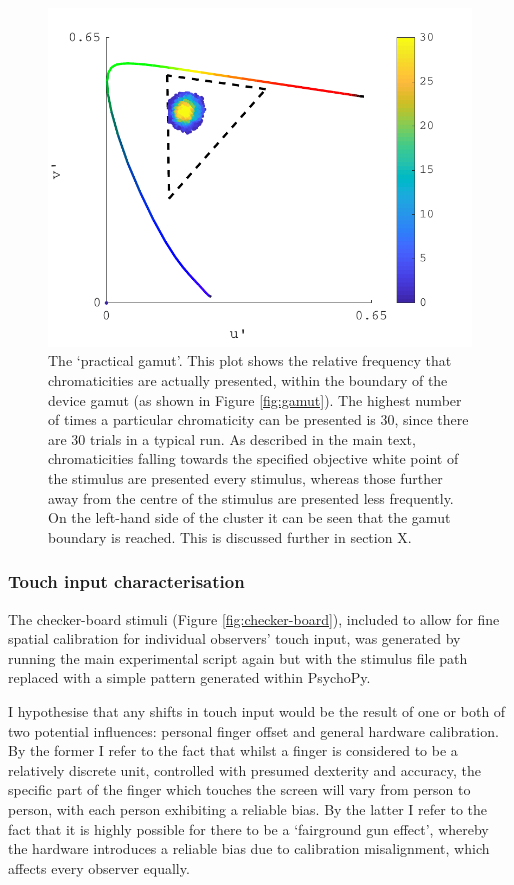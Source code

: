 \begin{figure}[hbp]
\includegraphics[max width=\textwidth]{figs/tablet/practical_gamut.pdf}
\caption{The `practical gamut'. This plot shows the relative frequency that chromaticities are actually presented, within the boundary of the device gamut (as shown in Figure \ref{fig:gamut}). The highest number of times a particular chromaticity can be presented is 30, since there are 30 trials in a typical run. As described in the main text, chromaticities falling towards the specified objective white point of the stimulus are presented every stimulus, whereas those further away from the centre of the stimulus are presented less frequently. On the left-hand side of the cluster it can be seen that the gamut boundary is reached. This is discussed further in section X. %
}
\label{fig:practical}
\end{figure}


\subsubsection{Touch input characterisation} \label{sec:touch}
The checker-board stimuli (Figure \ref{fig:checker-board}), included to allow for fine spatial calibration for individual observers' touch input, was generated by running the main experimental script again but with the stimulus file path replaced with a simple pattern generated within PsychoPy.

I hypothesise that any shifts in touch input would be the result of one or both of two potential influences: personal finger offset and general hardware calibration. By the former I refer to the fact that whilst a finger is considered to be a relatively discrete unit, controlled with presumed dexterity and accuracy, the specific part of the finger which touches the screen will vary from person to person, with each person exhibiting a reliable bias. By the latter I refer to the fact that it is highly possible for there to be a `fairground gun effect', whereby the hardware introduces a reliable bias due to calibration misalignment, which affects every observer equally.

